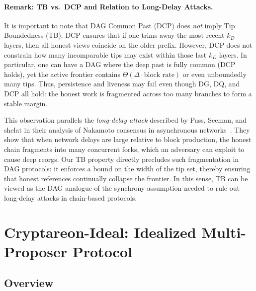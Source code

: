 \documentclass[11pt]{article}
\begin{document}
\paragraph{Remark: TB vs.\ DCP and Relation to Long-Delay Attacks.}
It is important to note that DAG Common Past (DCP) does \emph{not} imply Tip
Boundedness (TB). DCP ensures that if one trims away the most recent $k_D$ layers,
then all honest views coincide on the older prefix. However, DCP does not constrain
how many incomparable tips may exist within those last $k_D$ layers. In particular,
one can have a DAG where the deep past is fully common (DCP holds), yet the active
frontier contains $\Theta(\Delta \cdot \text{block rate})$ or even unboundedly many
tips. Thus, persistence and liveness may fail even though DG, DQ, and DCP all hold:
the honest work is fragmented across too many branches to form a stable margin.

This observation parallels the \emph{long-delay attack} described by Pass, Seeman,
and shelat in their analysis of Nakamoto consensus in asynchronous networks~\cite[Section 8]{EC:PasSeeShe17}. They show that when
network delays are large relative to block production, the honest chain fragments
into many concurrent forks, which an adversary can exploit to cause deep reorgs.
Our TB property directly precludes such fragmentation in DAG protocols: it enforces
a bound on the width of the tip set, thereby ensuring that honest references
continually collapse the frontier. In this sense, TB can be viewed as the DAG
analogue of the synchrony assumption needed to rule out long-delay attacks in
chain-based protocols.

\section{Cryptareon-Ideal: Idealized Multi-Proposer Protocol}
\label{sec:ideal}

\subsection{Overview}
\end{document}
